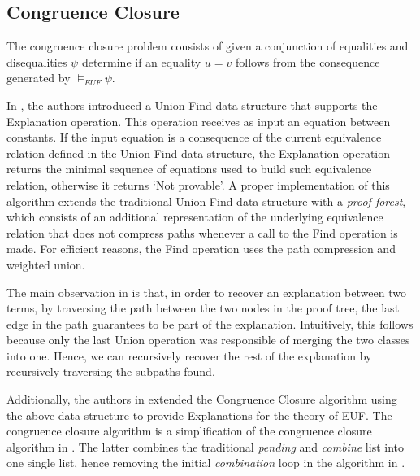 \subsection{Congruence Closure}

The congruence closure problem consists of given a conjunction of
equalities and disequalities $\psi$ determine if an equality
$u = v$ follows from the consequence generated by $\models_{EUF} 
\psi$.

In \cite{10.1007/978-3-540-32033-3_33}, the authors 
introduced a Union-Find data structure that supports the 
Explanation operation. This operation receives as input 
an equation between constants. If the input equation is 
a consequence of the current equivalence relation defined 
in the Union Find data structure, the Explanation operation 
returns the minimal sequence of equations used to build 
such equivalence relation, otherwise it returns 
`Not provable'. A proper implementation of this algorithm 
extends the traditional Union-Find data structure with 
a \emph{proof-forest}, which consists of an additional 
representation of the underlying equivalence relation that 
does not compress paths whenever a call to the Find 
operation is made. For efficient reasons, the Find 
operation uses the path compression and weighted union.

The main observation in \cite{10.1007/978-3-540-32033-3_33} 
is that, in order to recover an explanation between 
two terms, by traversing the path between the two nodes 
in the proof tree, the last edge in the path guarantees to 
be part of the explanation. Intuitively, this follows because only 
the last Union operation was responsible of merging the 
two classes into one. Hence, we can recursively recover 
the rest of the explanation by recursively traversing 
the subpaths found.

Additionally, the authors in \cite{10.1007/978-3-540-32033-3_33} 
extended the Congruence Closure algorithm 
\cite{10.1007/978-3-540-39813-4_5} using the above data 
structure to provide Explanations for the theory of EUF. The congruence 
closure algorithm is a simplification of the congruence 
closure algorithm in \cite{10.1145/322217.322228}. The latter 
combines the traditional \emph{pending} and \emph{combine} list 
into one single list, hence removing the initial 
\emph{combination} loop in the algorithm in 
\cite{10.1145/322217.322228}.


